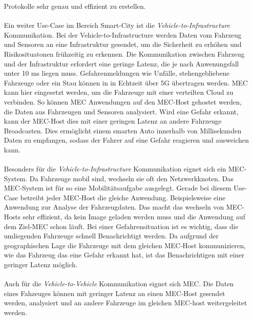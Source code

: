 \documentclass[runningheads]{llncs}
\numberwithin{figure}{section}
\begin{document}
Protokolle sehr genau und effizient zu erstellen. \cite{5GGivingLaw}
\\
\\
Ein weiter Use-Case im Bereich Smart-City ist die \textit{Vehicle-to-Infrastructure} Kommunikation.
Bei der Vehicle-to-Infrastructure werden Daten vom Fahrzeug und Sensoren an eine Infrastruktur gesendet, um die Sicherheit zu erhöhen und 
Risikosituatonen frühzeitig zu erkennen. 
Die Kommunikation zwischen Fahrzeug und der Infrastruktur erfordert eine geringe Latenz, 
die je nach Anwenungsfall unter 10 ms liegen muss. 
Gefahrenmeldungen wie Unfälle, stehengebliebene Fahrzeuge oder ein Stau können in in Echtzeit über 5G übertragen werden.
MEC kann hier eingesetzt werden, um die Fahrzeuge mit einer verteilten Cloud zu verbinden. So können MEC Anwendungen auf den MEC-Host 
gehostet werden, die Daten aus Fahrzeugen und Sensoren analysiert. Wird eine Gefahr erkannt, kann der MEC-Host dies mit einer
geringen Latenz an andere Fahrzeuge Broadcasten. 
Dies ermöglicht einem smarten Auto innerhalb von Millisekunden Daten zu empfangen, 
sodass der Fahrer auf eine Gefahr reagieren und ausweichen kann.
\\
\\
Besonders für die \textit{Vehicle-to-Infrastructure} Kommunikation eignet sich ein MEC-System. Da Fahrzeuge mobil sind, wechseln sie
oft den Netzwerkknoten. Das MEC-System ist für so eine Mobilitätsaufgabe ausgelegt. Gerade bei diesem Use-Case betreibt 
jeder MEC-Host die gleiche Anwendung. Beispielsweise eine Anwendung zur Analyse der Fahrzeugdaten. Das macht das wechseln von MEC-Hosts sehr effizient,
da kein Image geladen werden muss und die Anwendung auf dem Ziel-MEC schon läuft. Bei einer Gefahrensituation ist es wichtig, dass die
umliegenden Fahrzeuge schnell Benachrichtigt werden. Da aufgrund der geographischen Lage die Fahrzeuge mit dem gleichen MEC-Host
kommunizieren, wie das Fahrzeug das eine Gefahr erkannt hat, ist das Benachrichtigen mit einer geringer Latenz möglich. 
\\
\\
Auch für die \textit{Vehicle-to-Vehicle} Kommunikation eignet sich MEC. Die Daten eines Fahzeuges können mit geringer Latenz
an einen MEC-Host gesendet werden, analysiert und an andere Fahrzeuge im gleichen MEC-host weitergeleitet werden.
\end{document}
